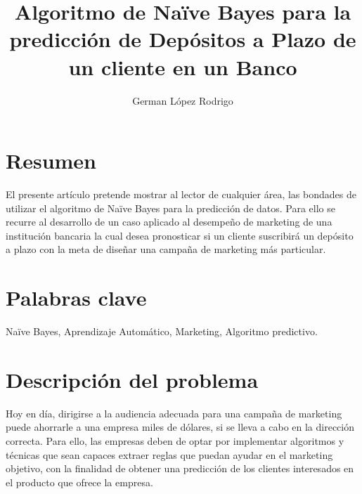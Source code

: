 \documentclass[letterpaper, 10 pt, conference]{ieeeconf}
\title{\LARGE \bf Algoritmo de Naïve Bayes para la predicción de Depósitos a Plazo de un cliente en un Banco}
\author{German López Rodrigo\\}
\begin{document}
\maketitle
\thispagestyle{empty}
\pagestyle{empty}

\section{Resumen}

El presente artículo pretende mostrar al lector de cualquier área, las bondades de utilizar el algoritmo de Naïve Bayes para la predicción de datos. Para ello se recurre al desarrollo de un caso aplicado al desempeño de marketing de una institución bancaria la cual desea pronosticar si un cliente suscribirá un depósito a plazo con la meta de diseñar una campaña de marketing más particular.

\section{Palabras clave}
Naïve Bayes, Aprendizaje Automático, Marketing, Algoritmo predictivo.

\section{Descripción del problema}

Hoy en día, dirigirse a la audiencia adecuada para una campaña de marketing puede ahorrarle a una empresa miles de dólares, si se lleva a cabo en la dirección correcta. Para ello, las empresas deben de optar por implementar algoritmos y técnicas que sean capaces extraer reglas que puedan ayudar en el marketing objetivo, con la finalidad de obtener una predicción de los clientes interesados en el producto que ofrece la empresa.\\
\end{document}

